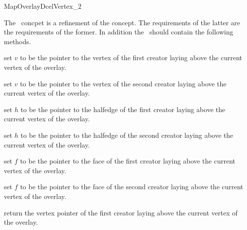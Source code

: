 
\ccRefPageBegin


\begin{ccRefConcept}{MapOverlayDcelVertex_2}


The \ccRefName\ concpet is a refinement of the  concept. 
The requirements of the latter are the requirements of the former.
In addition the \ccRefName\ should contain the following methods.

  \ccOperations
  {set $v$ to be the pointer to the vertex of the first creator laying above the current vertex of the overlay.}
  
  {set $v$ to be the pointer to the vertex of the second creator laying above the current vertex of the overlay.}
  
  {set $h$ to be the pointer to the halfedge of the first creator laying above the current vertex of the overlay.}

  {set $h$ to be the pointer to the halfedge of the second creator laying above the current vertex of the overlay.}

  {set $f$ to be the pointer to the face of the first creator laying above the current vertex of the overlay.}
  
  {set $f$ to be the pointer to the face of the second creator laying above the current vertex of the overlay.}
  
  {return the vertex pointer of the first creator laying above the current vertex of the overlay.}
  

\end{ccRefConcept}
